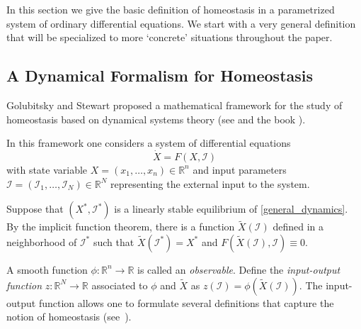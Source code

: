 \documentclass[a4paper,fleqn]{cas-dc}
\newcommand{\R}{\mathbb{R}}
\newcommand{\II}{{\mathcal I}}
\begin{document}
In this section we give the basic definition of homeostasis in a parametrized system of ordinary differential equations.
We start with a very general definition that will be specialized to more `concrete' situations throughout the paper.

\subsection{A Dynamical Formalism for Homeostasis}

Golubitsky and Stewart \cite{gs2017,gs2018} proposed a mathematical framework for the study of homeostasis based on dynamical systems theory (see \cite{gsahy2020} and the book \cite{gs2023}).

In this framework one considers a system of differential equations 
\begin{equation} \label{general_dynamics}
  \dot{X} = F(X, \II)
\end{equation}
with state variable $X=(x_1,\ldots,x_n) \in \R^n$ and input parameters $\II=(\II_1,\ldots,\II_N) \in \R^N$ representing the external input to the system.

Suppose that $(X^*,\II^*)$ is a linearly stable equilibrium of \eqref{general_dynamics}. 
By the implicit function theorem, there is a function $\tilde{X}(\II)$ defined in a neighborhood of $\II^*$ such that $\tilde{X}(\II^*) = X^*$ and $F(\tilde{X}(\II), \II) \equiv 0$. 

A smooth function $\phi:\mathbb{R}^{n}\to\mathbb{R}$ is called an \emph{observable}.
Define the \emph{input-output function} $z:\mathbb{R}^{N}\to\mathbb{R}$ associated to $\phi$ and $\tilde{X}$ as $z(\II)=\phi(\tilde{X}(\II))$.
The input-output function allows one to formulate several definitions that capture the notion of homeostasis (see~\cite{ma2009,ang2013,tang2016,gs2017,gs2018}).
\end{document}
